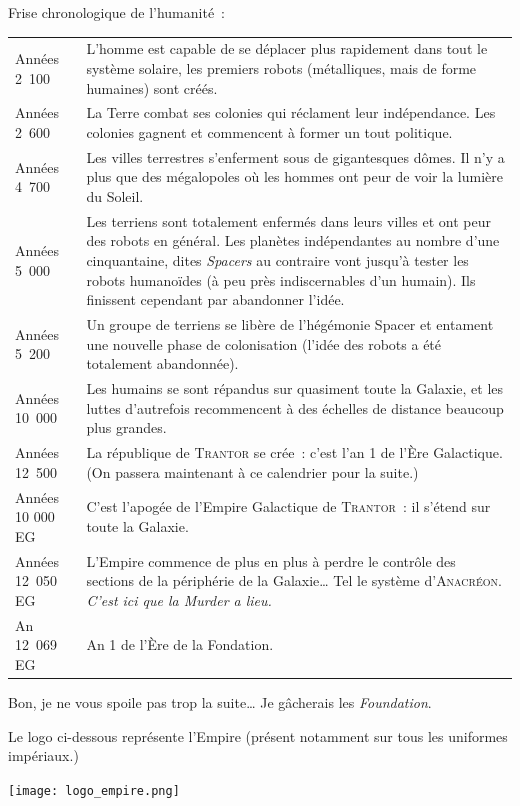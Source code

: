 Frise chronologique de l’humanité~: \\[5pt]
\begin{tabular}{@{}p{\annee}p{\texte}@{}}
Années 2~100 & L’homme est capable de se déplacer plus rapidement dans tout le système solaire, les premiers robots (métalliques, mais de forme humaines) sont créés. \\[5pt]
Années 2~600 & La Terre combat ses colonies qui réclament leur indépendance. Les colonies gagnent et commencent à former un tout politique. \\[5pt]
Années 4~700 & Les villes terrestres s’enferment sous de gigantesques dômes. Il n’y a plus que des mégalopoles où les hommes ont peur de voir la lumière du Soleil. \\[5pt]
Années 5~000 & Les terriens sont totalement enfermés dans leurs villes et ont peur des robots en général. Les planètes indépendantes au nombre d’une cinquantaine, dites \textit{Spacers} au contraire vont jusqu’à tester les robots humanoïdes (à peu près indiscernables d’un humain).  Ils finissent cependant par abandonner l’idée. \\[5pt]
Années 5~200 & Un groupe de terriens se libère de l’hégémonie Spacer et entament une nouvelle phase de colonisation (l’idée des robots a été totalement abandonnée). \\[5pt]
Années 10~000 & Les humains se sont répandus sur quasiment toute la Galaxie, et les luttes d’autrefois recommencent à des échelles de distance beaucoup plus grandes. \\[5pt]
Années 12~500 & La république de \textsc{Trantor} se crée~: c’est l’an 1 de l’Ère Galactique. (On passera maintenant à ce calendrier pour la suite.) \\[5pt]
Années 10 000 EG & C’est l’apogée de l’Empire Galactique de \textsc{Trantor}~: il s’étend sur toute la Galaxie. \\[5pt]
Années 12~050 EG & L’Empire commence de plus en plus à perdre le contrôle des sections de la périphérie de la Galaxie… Tel le système d’\textsc{Anacréon}. \emph{C’est ici que la Murder a lieu.} \\[5pt]
An 12~069 EG & An 1 de l’Ère de la Fondation. \\[5pt]
\end{tabular}
Bon, je ne vous spoile pas trop la suite… Je gâcherais les \textit{Foundation}.

Le logo ci-dessous représente l’Empire (présent notamment sur tous les uniformes impériaux.)

\begin{center}
	\texttt{[image: logo\_empire.png]}
\end{center}

